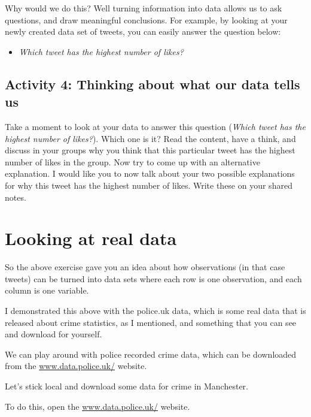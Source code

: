 \documentclass[
]{book}
\providecommand{\tightlist}{%
  \setlength{\itemsep}{0pt}\setlength{\parskip}{0pt}}
\begin{document}
Why would we do this? Well turning information into data allows us to ask questions, and draw meaningful conclusions. For example, by looking at your newly created data set of tweets, you can easily answer the question below:

\begin{itemize}
\tightlist
\item
  \emph{Which tweet has the highest number of likes?}
\end{itemize}

\hypertarget{activity-4-thinking-about-what-our-data-tells-us}{%
\subsection{Activity 4: Thinking about what our data tells us}\label{activity-4-thinking-about-what-our-data-tells-us}}

Take a moment to look at your data to answer this question (\emph{Which tweet has the highest number of likes?}). Which one is it? Read the content, have a think, and discuss in your groups why you think that this particular tweet has the highest number of likes in the group. Now try to come up with an alternative explanation. I would like you to now talk about your two possible explanations for why this tweet has the highest number of likes. Write these on your shared notes.

\hypertarget{looking-at-real-data}{%
\section{Looking at real data}\label{looking-at-real-data}}

So the above exercise gave you an idea about how observations (in that case tweets) can be turned into data sets where each row is one observation, and each column is one variable.

I demonstrated this above with the police.uk data, which is some real data that is released about crime statistics, as I mentioned, and something that you can see and download for yourself.

We can play around with police recorded crime data, which can be downloaded from the \href{https://data.police.uk/}{www.data.police.uk/} website.

Let's stick local and download some data for crime in Manchester.

To do this, open the \href{https://data.police.uk/}{www.data.police.uk/} website.
\end{document}
